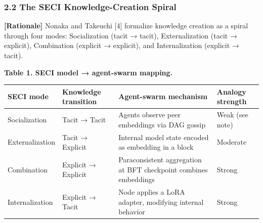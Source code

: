 \subsubsection{2.2 The SECI Knowledge-Creation
Spiral}\label{the-seci-knowledge-creation-spiral}

\textbf{{[}Rationale{]}} Nonaka and Takeuchi {[}4{]} formalize knowledge
creation as a spiral through four modes: Socialization (tacit → tacit),
Externalization (tacit → explicit), Combination (explicit → explicit),
and Internalization (explicit → tacit).

\textbf{Table 1. SECI model → agent-swarm mapping.}

{\def\LTcaptype{none} %
\begin{longtable}[]{@{}
  >{\raggedright\arraybackslash}p{}
  >{\raggedright\arraybackslash}p{}
  >{\raggedright\arraybackslash}p{}
  >{\raggedright\arraybackslash}p{}@{}}
\toprule\noalign{}
\begin{minipage}[b]{\linewidth}\raggedright
SECI mode
\end{minipage} & \begin{minipage}[b]{\linewidth}\raggedright
Knowledge transition
\end{minipage} & \begin{minipage}[b]{\linewidth}\raggedright
Agent-swarm mechanism
\end{minipage} & \begin{minipage}[b]{\linewidth}\raggedright
Analogy strength
\end{minipage} \\
\midrule\noalign{}
\endhead
\bottomrule\noalign{}
\endlastfoot
Socialization & Tacit → Tacit & Agents observe peer embeddings via DAG
gossip & Weak (see note) \\
Externalization & Tacit → Explicit & Internal model state encoded as
embedding in a block & Moderate \\
Combination & Explicit → Explicit & Paraconsistent aggregation at BFT
checkpoint combines embeddings & Strong \\
Internalization & Explicit → Tacit & Node applies a LoRA adapter,
modifying internal behavior & Strong \\
\end{longtable}
}

